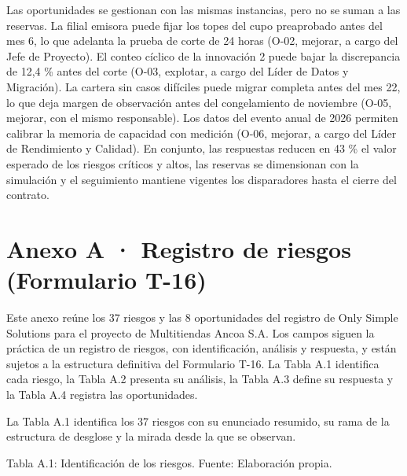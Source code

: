 \documentclass[11pt]{article}
\begin{document}
Las oportunidades se gestionan con las mismas instancias, pero no se suman a las reservas. La filial emisora puede fijar los topes del cupo preaprobado antes del mes 6, lo que adelanta la prueba de corte de 24 horas (O-02, mejorar, a cargo del Jefe de Proyecto). El conteo cíclico de la innovación 2 puede bajar la discrepancia de 12,4 \% antes del corte (O-03, explotar, a cargo del Líder de Datos y Migración). La cartera sin casos difíciles puede migrar completa antes del mes 22, lo que deja margen de observación antes del congelamiento de noviembre (O-05, mejorar, con el mismo responsable). Los datos del evento anual de 2026 permiten calibrar la memoria de capacidad con medición (O-06, mejorar, a cargo del Líder de Rendimiento y Calidad). En conjunto, las respuestas reducen en 43 \% el valor esperado de los riesgos críticos y altos, las reservas se dimensionan con la simulación y el seguimiento mantiene vigentes los disparadores hasta el cierre del contrato.

\section*{Anexo A · Registro de riesgos (Formulario T-16)}

Este anexo reúne los 37 riesgos y las 8 oportunidades del registro de Only Simple Solutions para el proyecto de Multitiendas Ancoa S.A. Los campos siguen la práctica de un registro de riesgos, con identificación, análisis y respuesta, y están sujetos a la estructura definitiva del Formulario T-16. La Tabla A.1 identifica cada riesgo, la Tabla A.2 presenta su análisis, la Tabla A.3 define su respuesta y la Tabla A.4 registra las oportunidades.

La Tabla A.1 identifica los 37 riesgos con su enunciado resumido, su rama de la estructura de desglose y la mirada desde la que se observan.

Tabla A.1: Identificación de los riesgos. Fuente: Elaboración propia.
\end{document}
